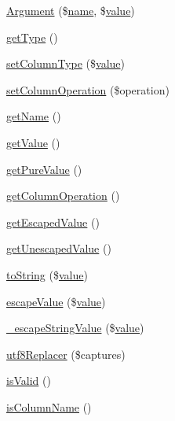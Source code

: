 \begin{DoxyCompactItemize}
\item 
\hyperlink{classArgument_aa9089313bf5ad3d10939dc1e70ee84fe}{Argument} (\$\hyperlink{common_8js_a22c29d2aa8ed6161ce8faa718ef76e68}{name}, \$\hyperlink{common_2js_2jquery_8js_abe5393d870043cf6aaa1d5ad5fce755c}{value})
\item 
\hyperlink{classArgument_a62ea3d6e7689c8a40f6f9722e76fa7a8}{get\+Type} ()
\item 
\hyperlink{classArgument_a849c6abe0d16f2fdf21c38db6844bd9d}{set\+Column\+Type} (\$\hyperlink{common_2js_2jquery_8js_abe5393d870043cf6aaa1d5ad5fce755c}{value})
\item 
\hyperlink{classArgument_a3e737e0b4af5559f56b35c7c1b1b4f2a}{set\+Column\+Operation} (\$operation)
\item 
\hyperlink{classArgument_a592176260424f46cf1b83bf2eb14014e}{get\+Name} ()
\item 
\hyperlink{classArgument_a53b70d0071096047437015737d5d7728}{get\+Value} ()
\item 
\hyperlink{classArgument_a54140067b590d8ce8dcd7d09f56519cd}{get\+Pure\+Value} ()
\item 
\hyperlink{classArgument_a8720ec6d3b4cccdb6dfdd072bb77c9d3}{get\+Column\+Operation} ()
\item 
\hyperlink{classArgument_a02ee73fa63dd2cd754412f176dae54da}{get\+Escaped\+Value} ()
\item 
\hyperlink{classArgument_a45a70c173c816e9cf2c7c5f396a92a6f}{get\+Unescaped\+Value} ()
\item 
\hyperlink{classArgument_a6fa3a8b473d05a02c7746a143e51ef81}{to\+String} (\$\hyperlink{common_2js_2jquery_8js_abe5393d870043cf6aaa1d5ad5fce755c}{value})
\item 
\hyperlink{classArgument_a217bae48930e0208210aa7030a2f2b27}{escape\+Value} (\$\hyperlink{common_2js_2jquery_8js_abe5393d870043cf6aaa1d5ad5fce755c}{value})
\item 
\hyperlink{classArgument_afd7b071db98f0a4c8ef60cdd8db8a3b2}{\+\_\+escape\+String\+Value} (\$\hyperlink{common_2js_2jquery_8js_abe5393d870043cf6aaa1d5ad5fce755c}{value})
\item 
\hyperlink{classArgument_aaf7f8b67195ed2e1b404339d107d6a1c}{utf8\+Replacer} (\$captures)
\item 
\hyperlink{classArgument_a3e07b6c495166e96aea4e4f90bb0fe53}{is\+Valid} ()
\item 
\hyperlink{classArgument_aced37db9a6cf1ec57e8acdea23797927}{is\+Column\+Name} ()
\item 

\end{DoxyCompactItemize}
